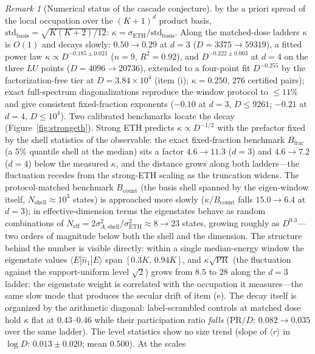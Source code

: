 \documentclass[11pt,a4paper]{article}
\theoremstyle{plain}
\theoremstyle{definition}
\theoremstyle{remark}
\newtheorem{remark}[theorem]{Remark}
\begin{document}
\begin{remark}[Numerical status of the cascade conjecture]
by the a priori spread of the local occupation over the $(K+1)^{d}$ product basis,
$\mathrm{std}_{\mathrm{basis}}=\sqrt{K(K+2)/12}$:
$\kappa=\sigma_{\mathrm{ETH}}/\mathrm{std}_{\mathrm{basis}}$. Along the matched-dose
ladders $\kappa$ is $O(1)$ and decays slowly: $0.50\to0.29$ at $d=3$
($D=3375\to59319$), a fitted power law $\kappa\propto D^{-0.185\pm0.021}$ ($n=9$,
$R^{2}=0.92$), and $D^{-0.222\pm0.003}$ at $d=4$ on the three $LU$ points
($D=4096\to20736$), extended to a four-point fit $D^{-0.255}$ by the
factorization-free tier at $D=3.84\times10^{4}$ (item (i); $\kappa=0.250$, $276$ certified
pairs); exact full-spectrum
diagonalizations reproduce the window protocol to $\leq11\%$ and give consistent
fixed-fraction exponents ($-0.10$ at $d=3$, $D\leq9261$; $-0.21$ at $d=4$, $D\leq10^{4}$).
Two calibrated benchmarks locate the decay (Figure~\ref{fig:strongeth}). Strong ETH predicts
$\kappa\propto D^{-1/2}$ with the prefactor fixed by the shell statistics of the observable:
the exact fixed-fraction benchmark $B_{\mathrm{frac}}$ (a $5\%$ quantile shell at the median)
sits a factor $4.6\to11.3$ ($d=3$) and $4.6\to7.2$ ($d=4$) below the measured $\kappa$, and
the distance grows along both ladders---the fluctuation recedes from the strong-ETH scaling
as the truncation widens. The protocol-matched benchmark $B_{\mathrm{count}}$ (the basis shell
spanned by the eigen-window itself, $N_{\mathrm{shell}}\approx10^{3}$ states) is approached
more slowly ($\kappa/B_{\mathrm{count}}$ falls $15.0\to6.4$ at $d=3$); in effective-dimension
terms the eigenstates behave as random combinations of
$N_{\mathrm{eff}}=2\sigma_{A,\mathrm{shell}}^{2}/\sigma_{\mathrm{ETH}}^{2}\approx8\to23$ states,
growing roughly as $D^{0.3}$---two orders of magnitude below both the shell and the
dimension. The structure behind the number is visible directly: within a single
median-energy window the eigenstate values $\langle E|\hat n_{1}|E\rangle$ span $[0.3K,\,0.94K]$,
and $\kappa\sqrt{\mathrm{PR}}$ (the fluctuation against the support-uniform level $\sqrt{2}$)
grows from $8.5$ to $28$ along the $d=3$ ladder: the eigenstate weight is correlated with the
occupation it measures---the same slow mode that produces the secular drift of item (e). The
decay itself is organized by the arithmetic diagonal: label-scrambled controls at matched
dose hold $\kappa$ flat at $0.43$--$0.46$ while their participation ratio \emph{falls}
($\mathrm{PR}/D$: $0.082\to0.035$ over the same ladder). The level statistics show no size
trend (slope of $\langle r\rangle$ in $\log D$: $0.013\pm0.020$; mean $0.500$). At the scales

\end{remark}
\end{document}
